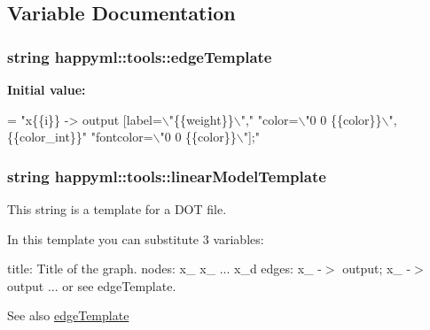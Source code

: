 \subsection{Variable Documentation}
\subsubsection[{\texorpdfstring{edge\+Template}{edgeTemplate}}]{\setlength{\rightskip}{0pt plus 5cm}string happyml\+::tools\+::edge\+Template}\hypertarget{namespacehappyml_1_1tools_a20d872d51bf3b6d07fda7ad88ae36892}{}\label{namespacehappyml_1_1tools_a20d872d51bf3b6d07fda7ad88ae36892}
{\bfseries Initial value\+:}
\begin{DoxyCode}
= \textcolor{stringliteral}{"x\{\{i\}\} -> output [label=\(\backslash\)"\{\{weight\}\}\(\backslash\)","}
            \textcolor{stringliteral}{"color=\(\backslash\)"0 0 \{\{color\}\}\(\backslash\)",\{\{color\_int\}\}"}
            \textcolor{stringliteral}{"fontcolor=\(\backslash\)"0 0 \{\{color\}\}\(\backslash\)"];"}
\end{DoxyCode}
\subsubsection[{\texorpdfstring{linear\+Model\+Template}{linearModelTemplate}}]{\setlength{\rightskip}{0pt plus 5cm}string happyml\+::tools\+::linear\+Model\+Template}\hypertarget{namespacehappyml_1_1tools_ac77ec5d0f63f0beee949d5f246e40d79}{}\label{namespacehappyml_1_1tools_ac77ec5d0f63f0beee949d5f246e40d79}


This string is a template for a D\+OT file. 

In this template you can substitute 3 variables\+:

title\+: Title of the graph. nodes\+: x\+\_ x\+\_ ... x\+\_\+d edges\+: x\+\_ -\/$>$ output; x\+\_ -\/$>$ output ... or see edge\+Template.

\begin{DoxySeeAlso}{See also}
\hyperlink{namespacehappyml_1_1tools_a20d872d51bf3b6d07fda7ad88ae36892}{edge\+Template} 
\end{DoxySeeAlso}
